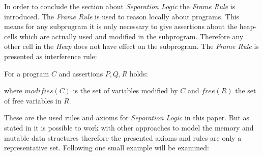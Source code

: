 	In order to conclude the section about \emph{Separation Logic} the
	\emph{Frame Rule} is introduced. The \emph{Frame Rule} is used to reason
	locally about programs. This means for any subprogram it is only necessary
	to give assertions about the heap-cells which are actually used and modified
	in the subprogram. Therefore any other cell in the \emph{Heap} does not have
	effect on the subprogram. The \emph{Frame Rule} is presented as interference
	rule:
	\begin{mydef}
		For a program $C$ and assertions $P,Q,R$ holds:
		\begin{prooftree}
		\end{prooftree}
	where $\textit{modifies}(C)$ is the set of variables modified by $C$ and
	$\textit{free}(R)$ the set of free variables in $R$.
	\end{mydef}
	These are the used rules and axioms for \emph{Separation Logic} in this paper.
	But as stated in \cite{freshlook} it is possible to work with other approaches
	to model the memory and mutable data structures therefore the presented
	axioms and rules are only a representative set.
	Following one small example will be examined:
